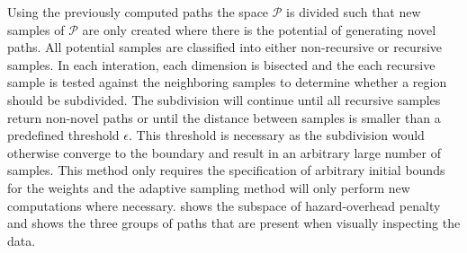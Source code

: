 Using the previously computed paths the space $\mathcal{P}$ is divided such that new samples of $\mathcal{P}$ are only created where there is the potential of generating novel paths.  All potential samples are classified into either non-recursive or recursive samples.  In each interation, each dimension is bisected and the each recursive sample is tested against the neighboring samples to determine whether a region should be subdivided.  The subdivision will continue until all recursive samples return non-novel paths or until the distance between samples is smaller than a predefined threshold $\epsilon$.  This threshold is necessary as the subdivision would otherwise converge to the boundary and result in an arbitrary large number of samples.   This method only requires the specification of arbitrary initial bounds for the weights and the adaptive sampling method will only perform new computations where necessary.   shows the subspace of hazard-overhead penalty and shows the three groups of paths that are present when visually inspecting the data.



